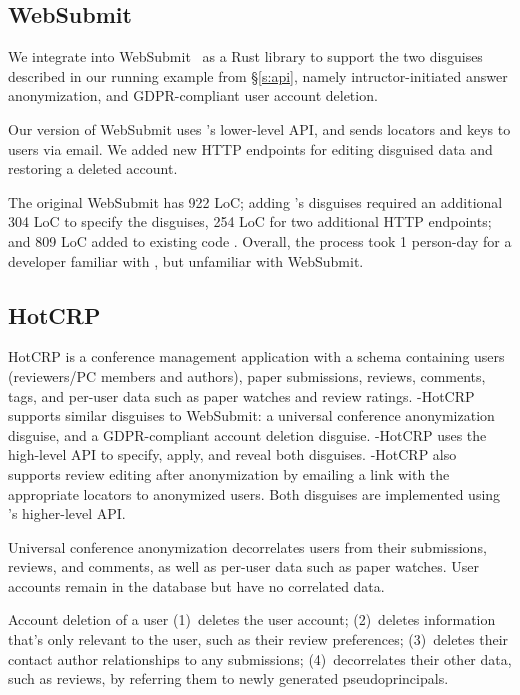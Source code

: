 \subsection{WebSubmit}
\label{s:case-websubmit}
%
We integrate \sys into WebSubmit~\cite{websubmit-rs-anon} as a Rust library to support the two
disguises described in our running example from \S\ref{s:api}, namely intructor-initiated answer anonymization, and GDPR-compliant user account deletion.

Our version of WebSubmit uses \sys's lower-level API, and sends locators and keys to users via
email.
%
We added new HTTP endpoints for editing disguised data and restoring a deleted account.
%

The original WebSubmit has 922 LoC; adding \sys's disguises required an additional 304 LoC
to specify the disguises, 254 LoC for two additional HTTP endpoints; and 809 LoC added to
existing code  .
%
Overall, the process took 1 person-day for a developer familiar with \sys, but
unfamiliar with WebSubmit.
%

\subsection{HotCRP}
HotCRP is a conference management application with a schema containing users (reviewers/PC members and
authors), paper submissions, reviews, comments, tags, and per-user data such as paper watches and review ratings.
%
\sys-HotCRP supports similar disguises to WebSubmit: a universal conference anonymization disguise,
and a GDPR-compliant account deletion disguise.  \sys-HotCRP uses the high-level \sys API to
specify, apply, and reveal both disguises.  \sys-HotCRP also supports review editing after
anonymization by emailing a link with the appropriate locators to anonymized users. Both disguises
are implemented using \sys's higher-level API.

Universal conference anonymization decorrelates users from their submissions, reviews, and comments,
as well as per-user data such as paper watches. User accounts remain in the database but have no
correlated data.

 Account deletion of a user
%
(1)~deletes the user account;
%
(2)~deletes information that's only relevant to the user, such as their review preferences;
%
(3)~deletes their contact author relationships to any submissions;
%
(4)~decorrelates their other data, such as reviews, by referring them to newly generated
pseudoprincipals.

